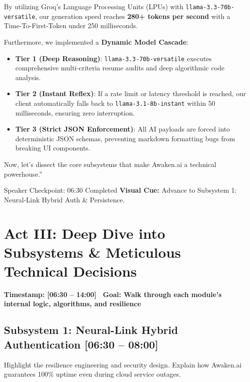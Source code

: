 \documentclass[11pt,a4paper]{article}
\begin{document}
By utilizing Groq's Language Processing Units (LPUs) with \texttt{llama-3.3-70b-versatile}, our generation speed reaches \textbf{280+ tokens per second} with a Time-To-First-Token under 250 milliseconds. 

Furthermore, we implemented a \textbf{Dynamic Model Cascade}:
\begin{itemize}
    \item \textbf{Tier 1 (Deep Reasoning)}: \texttt{llama-3.3-70b-versatile} executes comprehensive multi-criteria resume audits and deep algorithmic code analysis.
    \item \textbf{Tier 2 (Instant Reflex)}: If a rate limit or latency threshold is reached, our client automatically falls back to \texttt{llama-3.1-8b-instant} within 50 milliseconds, ensuring zero interruption.
    \item \textbf{Tier 3 (Strict JSON Enforcement)}: All AI payloads are forced into deterministic JSON schemas, preventing markdown formatting bugs from breaking UI components.
\end{itemize}

Now, let's dissect the core subsystems that make Awaken.ai a technical powerhouse.''

\begin{timingbox}{Speaker Checkpoint: 06:30 Completed}
\textbf{Visual Cue:} Advance to Subsystem 1: Neural-Link Hybrid Auth \& Persistence.
\end{timingbox}

\newpage

\section{Act III: Deep Dive into Subsystems \& Meticulous Technical Decisions}
\textcolor{accentyellow}{\textbf{Timestamp: [06:30 -- 14:00] \textbar\ Goal: Walk through each module's internal logic, algorithms, and resilience}}

\subsection{Subsystem 1: Neural-Link Hybrid Authentication [06:30 -- 08:00]}

\begin{speakercue}{Highlight the resilience engineering and security design.}
Explain how Awaken.ai guarantees 100\% uptime even during cloud service outages.
\end{speakercue}
\end{document}
